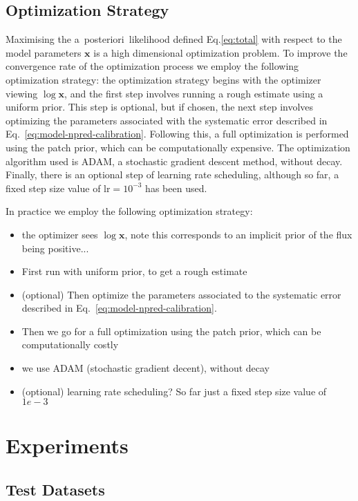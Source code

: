 \documentclass[twocolumn]{aastex631}
\newcommand{\aposteriori}{a~posteriori~}
\begin{document}
    \subsection{Optimization Strategy}
    Maximising the \aposteriori likelihood defined Eq.\ref{eq:total} with respect to the model parameters $\mathbf{x}$ is a high dimensional optimization problem. To improve the convergence rate of the optimization process we employ the following optimization strategy: the optimization strategy begins with the optimizer viewing $\log{\mathbf{x}}$, and the first step involves running a rough estimate using a uniform prior. This step is optional, but if chosen, the next step involves optimizing the parameters associated with the systematic error described in Eq.~\ref{eq:model-npred-calibration}. Following this, a full optimization is performed using the patch prior, which can be computationally expensive. The optimization algorithm used is ADAM, a stochastic gradient descent method, without decay. Finally, there is an optional step of learning rate scheduling, although so far, a fixed step size value of $\mathrm{lr}=10^{-3}$ has been used.
    
    In practice we employ the following optimization strategy:
    \begin{itemize}
        \item the optimizer sees $\log{\mathbf{x}}$, note this corresponds to an implicit prior of the flux being positive...
        \item First run with uniform prior, to get a rough estimate
        \item (optional) Then optimize the parameters associated to the systematic error described in Eq.~\ref{eq:model-npred-calibration}.
        \item Then we go for a full optimization using the patch prior, which can be computationally costly
        \item we use ADAM (stochastic gradient decent), without decay
        \item  (optional) learning rate scheduling? So far just a fixed step size value of $1e-3$
    \end{itemize}
    
    
        
    \section{Experiments}
    \subsection{Test Datasets}
    \label{subsec:test-datasets}
\end{document}

